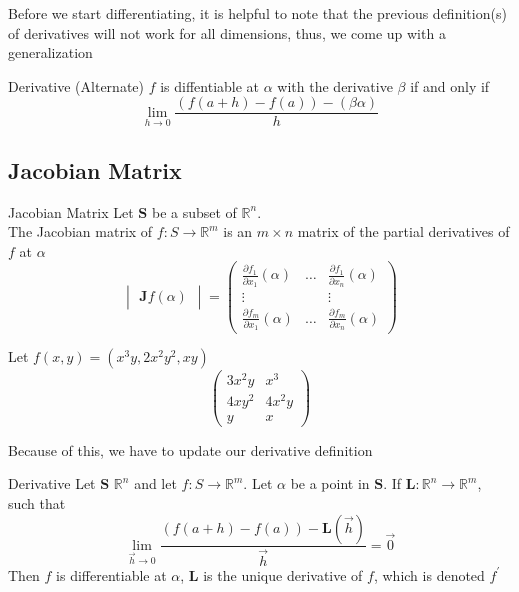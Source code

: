 Before we start differentiating, it is helpful to note that the previous
definition(s) of derivatives will not work for all dimensions, thus, we come up with a generalization

\begin{definition}{Derivative (Alternate)}
  $f$ is diffentiable at $\alpha$ with the derivative $\beta$ if and only if
  \[
    \lim_{h \to 0} \frac{(f(a+h) - f(a)) - (\beta\alpha)}{h}
  \]
\end{definition}

\subsection{Jacobian Matrix}

\begin{definition}{Jacobian Matrix}
Let $\mathbf{S}$ be a subset of $\mathbb{R}^{n}$.\\
The Jacobian matrix of $f: S \to \mathbb{R}^{m}$ is an $m \times n$ matrix of the partial derivatives of $f$ at $\alpha$
\[
\begin{vmatrix}
  \mathbf{J}f(\alpha)
\end{vmatrix}
= \begin{pmatrix}
  \frac{\partial f_1}{\partial x_1}(\alpha) & \ldots & \frac{\partial f_1}{\partial x_n}(\alpha)\\
  \vdots & & \vdots\\
  \frac{\partial f_m}{\partial x_1}(\alpha) & \ldots & \frac{\partial f_m}{\partial x_n}(\alpha)
\end{pmatrix}
\]
\end{definition}

\begin{eg}
  Let $f(x, y) = (x^3y, 2x^2y^2, xy)$
  \[
    \begin{pmatrix}
      3x^2y & x^3\\
      4xy^2 & 4x^2y\\
      y & x
    \end{pmatrix}
  \]
\end{eg}
\newpage
Because of this, we have to update our derivative definition

\begin{definition}{Derivative}
  Let $\mathbf{S}$ \subset $\mathbb{R}^n$ and let $f: S \to \mathbb{R}^m$. Let $\alpha$ be a point in $\mathbf{S}$.
  If $\mathbf{L}: \mathbb{R}^n\to\mathbb{R}^m$, such that
  \[
    \lim_{\vec{h} \to 0} \frac{(f(a + h) - f(a)) - \mathbf{L}(\vec{h})}{\vec{h}} = \vec{0}
    \]
  Then $f$ is differentiable at $\alpha$, $\mathbf{L}$ is the unique derivative of $f$, which is denoted $f^\prime$
\end{definition}
